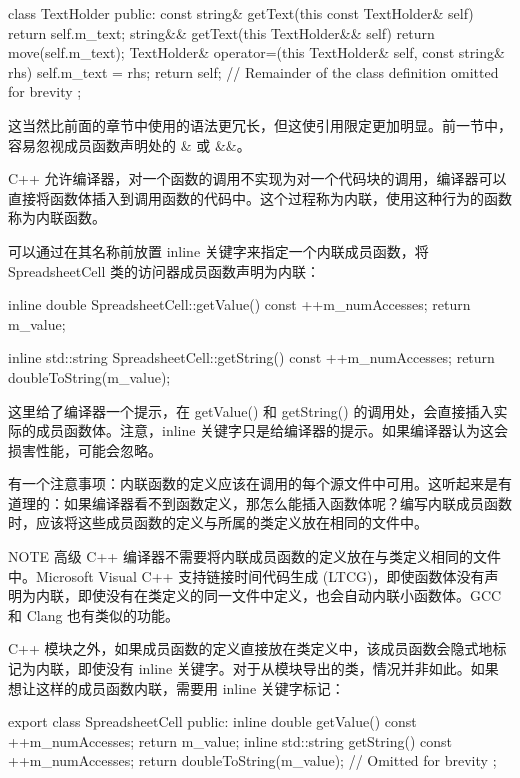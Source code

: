 \begin{cpp}
class TextHolder
{
    public:
        const string& getText(this const TextHolder& self) { return self.m_text; }
        string&& getText(this TextHolder&& self) { return move(self.m_text); }
        TextHolder& operator=(this TextHolder& self, const string& rhs)
        {
            self.m_text = rhs;
            return self;
        }
    // Remainder of the class definition omitted for brevity
};
\end{cpp}

这当然比前面的章节中使用的语法更冗长，但这使引用限定更加明显。前一节中，容易忽视成员函数声明处的 \& 或 \&\&。


C++ 允许编译器，对一个函数的调用不实现为对一个代码块的调用，编译器可以直接将函数体插入到调用函数的代码中。这个过程称为内联，使用这种行为的函数称为内联函数。

可以通过在其名称前放置 inline 关键字来指定一个内联成员函数，将 SpreadsheetCell 类的访问器成员函数声明为内联：

\begin{cpp}
inline double SpreadsheetCell::getValue() const
{
    ++m_numAccesses;
    return m_value;
}

inline std::string SpreadsheetCell::getString() const
{
    ++m_numAccesses;
    return doubleToString(m_value);
}
\end{cpp}

这里给了编译器一个提示，在 getValue() 和 getString() 的调用处，会直接插入实际的成员函数体。注意，inline 关键字只是给编译器的提示。如果编译器认为这会损害性能，可能会忽略。

有一个注意事项：内联函数的定义应该在调用的每个源文件中可用。这听起来是有道理的：如果编译器看不到函数定义，那怎么能插入函数体呢？编写内联成员函数时，应该将这些成员函数的定义与所属的类定义放在相同的文件中。

\begin{myNotic}{NOTE}
高级 C++ 编译器不需要将内联成员函数的定义放在与类定义相同的文件中。Microsoft Visual C++ 支持链接时间代码生成 (LTCG)，即使函数体没有声明为内联，即使没有在类定义的同一文件中定义，也会自动内联小函数体。GCC 和 Clang 也有类似的功能。
\end{myNotic}

C++ 模块之外，如果成员函数的定义直接放在类定义中，该成员函数会隐式地标记为内联，即使没有 inline 关键字。对于从模块导出的类，情况并非如此。如果想让这样的成员函数内联，需要用 inline 关键字标记：

\begin{cpp}
export class SpreadsheetCell
{
    public:
        inline double getValue() const { ++m_numAccesses; return m_value; }
        inline std::string getString() const
        {
            ++m_numAccesses;
            return doubleToString(m_value);
        }
        // Omitted for brevity
};
\end{cpp}

